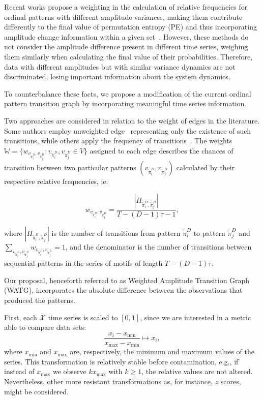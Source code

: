 \documentclass{isprs}
\begin{document}
Recent works propose a weighting in the calculation of relative frequencies for ordinal patterns with different amplitude variances, making them contribute differently to the final value of permutation entropy (PE) and thus incorporating amplitude change information within a given set~\cite{Fadlallah2013Weightedpermutation}.
However, these methods do not consider the amplitude difference present in different time series, weighing them similarly when calculating the final value of their probabilities.
Therefore, data with different amplitudes but with similar variance dynamics are not discriminated, losing important information about the system dynamics.

To counterbalance these facts, we propose a modification of the current ordinal pattern transition graph by incorporating meaningful time series information.

Two approaches are considered in relation to the weight of edges in the literature.
Some authors employ unweighted edge~\cite{McCullough2015lagged,Kulp2016ordinal} representing only the existence of such transitions, while others apply the frequency of transitions~\cite{Sorrentino2015periodic,Zhang2017ConstructingOP}.
The weights $\mathbb{W} = \{w_{v_{\widetilde{\pi}^D_i}, v_{\widetilde\pi^D_j}}: v_{\widetilde\pi^D_i}, v_{\widetilde\pi^D_j} \in V \}$ assigned to each edge describes the chances of transition between two particular patterns $(v_{\widetilde\pi^D_i}, v_{\widetilde\pi^D_j})$ calculated by their respective relative frequencies, ie:

\begin{equation}
w_{v_{\widetilde\pi^D_i}, v_{\widetilde\pi^D_j}} = \frac{|\Pi_{\widetilde\pi^D_i,\widetilde\pi^D_j}|}{T-(D-1)\tau-1},
\end{equation}

where $|\Pi_{\widetilde\pi^D_i,\widetilde\pi^D_j}|$ is the number of transitions from pattern $\widetilde\pi^D_i$ to pattern $\widetilde\pi^D_j$ and $\sum_{v_{\widetilde\pi^D_i}, v_{\widetilde\pi^D_j}}w_{v_{\widetilde\pi^D_i}, v_{\widetilde\pi^D_j}} = 1$,
and the denominator is the number of transitions between sequential patterns in the series of motifs of length $T-(D-1)\tau$.

Our proposal, henceforth referred to as Weighted Amplitude Transition Graph (WATG), incorporates the absolute difference between the observations that produced the patterns.

First, each $\mathcal{X}$ time series is scaled to $[0, 1]$, since we are interested in a metric able to compare data sets:
\begin{equation}
 \frac{x_i - x_{\min}}{x_{\max} - x_{\min}} \longmapsto x_i,
\end{equation}
where $x_{\min}$ and $x_{\max}$ are, respectively, the minimum and maximum values of the series.
This transformation is relatively stable before contamination, e.g., if instead of $x_{\max}$ we observe $k x_{\max}$ with $k\geq 1$, the relative values are not altered. Nevertheless, other more resistant transformations as, for instance, $z$ scores, might be considered.
\end{document}

